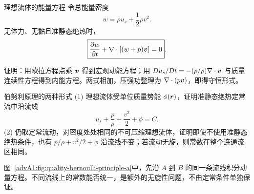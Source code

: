 {\begin{advtheorem}{理想流体的能量方程}\label{advA1:thm:bernoulli-energy}
令总能量密度
\[
 w=\rho u_s+\frac12\rho v^2.
\]
无体力、无黏且准静态绝热时，
\[
 \boxed{\frac{\partial w}{\partial t}
 +\nabla\cdot[(w+p)\bm{v}]=0}.
\]
\end{advtheorem}
证明：用欧拉方程点乘 $\bm{v}$ 得到宏观动能方程；用
$Du_s/Dt=-(p/\rho)\nabla\cdot\bm{v}$ 与质量连续性方程得到内能方程。两式相加，压强功整理为
$\nabla\cdot(p\bm{v})$，即得守恒形式。

\begin{advexamplebox}{伯努利原理的两种形式}\label{advA1:ex:bernoulli-principle}
(1) 理想流体受单位质量势能 $\phi(\bm{r})$，证明准静态绝热定常流中沿流线
\[
 u_s+\frac p\rho+\frac{v^2}{2}+\phi=C.
\]
(2) 仍取定常流动，对密度处处相同的不可压缩理想流体，证明即使不使用准静态绝热条件，也有
$p/\rho+v^2/2+\phi$ 沿流线不变；若流动无旋，则常数在整个连通流区相同。

\begin{qualityfigure}
\label{advA1:fig:quality-bernoulli-principle-q}
\end{qualityfigure}
\end{advexamplebox}
\begin{advsolution}
\begin{qualityfigure}
\label{advA1:fig:quality-bernoulli-principle-a}
\end{qualityfigure}
图~\ref{advA1:fig:quality-bernoulli-principle-a}中，先沿 $A$ 到 $B$ 的同一条流线积分动量方程。不同流线上的常数能否统一，是额外的无旋性问题，不由定常条件单独保证。


\end{advsolution}}
